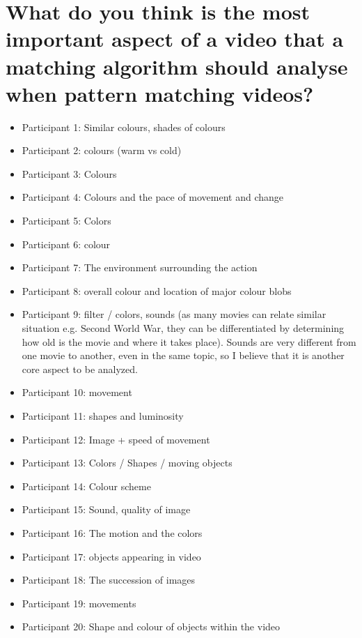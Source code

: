 \section{What do you think is the most important aspect of a video that a matching algorithm should analyse when pattern matching videos?}

\begin{itemize}
	\item Participant 1: Similar colours, shades of colours
    \item Participant 2: colours (warm vs cold) 
    \item Participant 3: Colours 
    \item Participant 4: Colours and the pace of movement and change
    \item Participant 5: Colors
    \item Participant 6: colour
    \item Participant 7: The environment surrounding the action
    \item Participant 8: overall colour and location of major colour blobs
    \item Participant 9: filter / colors, sounds (as many movies can relate similar situation e.g. Second World War, they can be differentiated by determining how old is the movie and where it takes place). Sounds are very different from one movie to another, even in the same topic, so I believe that it is another core aspect to be analyzed.
    \item Participant 10: movement 
    \item Participant 11: shapes and luminosity 
    \item Participant 12: Image + speed of movement 
    \item Participant 13: Colors / Shapes / moving objects
    \item Participant 14: Colour scheme
    \item Participant 15: Sound, quality of image
    \item Participant 16: The motion and the colors
    \item Participant 17: objects appearing in video
    \item Participant 18: The succession of images
    \item Participant 19: movements
    \item Participant 20: Shape and colour of objects within the video
\end{itemize}
